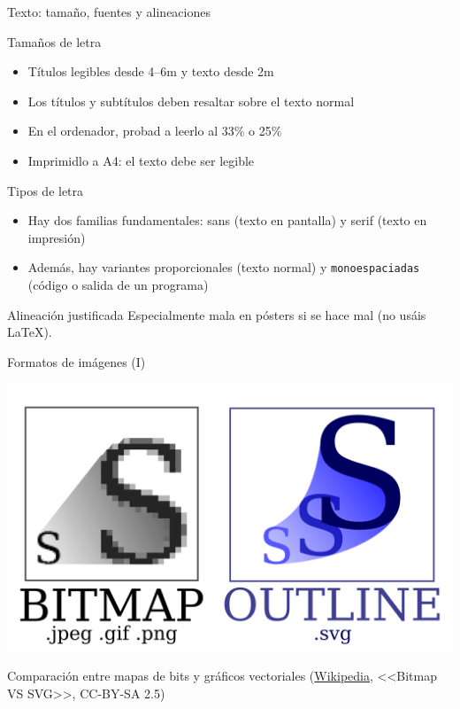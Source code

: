 \documentclass[xcolor=svgnames,compress]{beamer}
\begin{document}
\begin{frame}{Texto: tamaño, fuentes y alineaciones}

  \begin{block}{Tamaños de letra}
    \begin{itemize}
    \item Títulos legibles desde 4--6m y texto desde 2m
    \item Los títulos y subtítulos deben resaltar sobre el texto normal
    \item En el ordenador, probad a leerlo al 33\% o 25\%
    \item Imprimidlo a A4: el texto debe ser legible
    \end{itemize}
  \end{block}

  \begin{block}{Tipos de letra}
    \begin{itemize}
    \item Hay dos familias fundamentales: sans (texto en pantalla) y
      \textrm{serif} (texto en impresión)
    \item Además, hay variantes proporcionales (texto normal) y
      \texttt{monoespaciadas} (código o salida de un programa)
    \end{itemize}
  \end{block}

  \begin{block}{Alineación justificada}
    Especialmente mala en pósters si se hace mal (no usáis \LaTeX).
  \end{block}

\end{frame}

\begin{frame}{Formatos de imágenes (I)}
  \begin{center}
    \includegraphics[width=.9\textwidth,height=.8\textheight,keepaspectratio]{Bitmap_VS_SVG}

    Comparación entre mapas de bits y gráficos vectoriales
    (\href{http://en.wikipedia.org/wiki/File:Bitmap_VS_SVG.svg}{Wikipedia},
    <<Bitmap VS SVG>>, CC-BY-SA 2.5)
  \end{center}
\end{frame}
\end{document}
